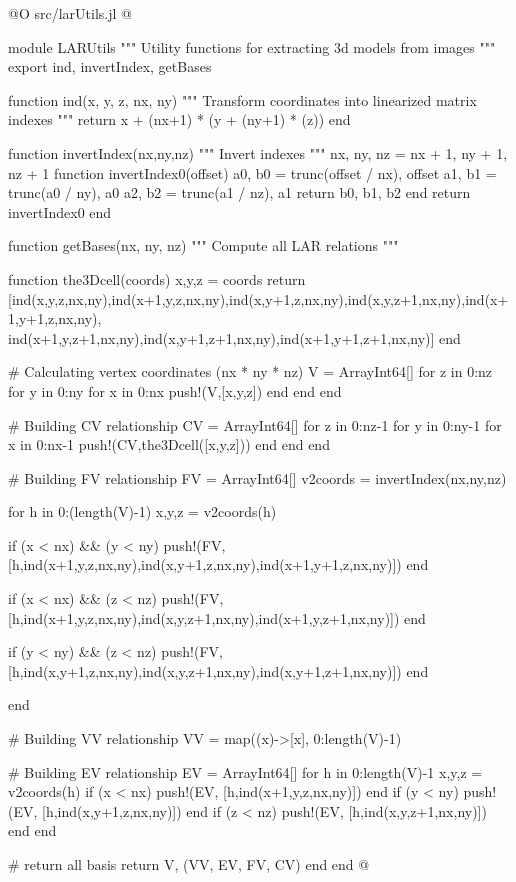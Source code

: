 \documentclass[11pt,oneside]{article}	%
\begin{document}
@O src/larUtils.jl
@{module LARUtils
"""
Utility functions for extracting 3d models from images
"""
export ind, invertIndex, getBases

function ind(x, y, z, nx, ny)
    """
    Transform coordinates into linearized matrix indexes
    """
    return x + (nx+1) * (y + (ny+1) * (z))
  end


function invertIndex(nx,ny,nz)
  """
  Invert indexes
  """
  nx, ny, nz = nx + 1, ny + 1, nz + 1
  function invertIndex0(offset)
      a0, b0 = trunc(offset / nx), offset %
      a1, b1 = trunc(a0 / ny), a0 %
      a2, b2 = trunc(a1 / nz), a1 %
      return b0, b1, b2
  end
  return invertIndex0
end


function getBases(nx, ny, nz)
  """
  Compute all LAR relations
  """

  function the3Dcell(coords)
    x,y,z = coords
    return [ind(x,y,z,nx,ny),ind(x+1,y,z,nx,ny),ind(x,y+1,z,nx,ny),ind(x,y,z+1,nx,ny),ind(x+1,y+1,z,nx,ny),
            ind(x+1,y,z+1,nx,ny),ind(x,y+1,z+1,nx,ny),ind(x+1,y+1,z+1,nx,ny)]
  end

  # Calculating vertex coordinates (nx * ny * nz)
  V = Array{Int64}[]
  for z in 0:nz
    for y in 0:ny
      for x in 0:nx
        push!(V,[x,y,z])
      end
    end
  end


  # Building CV relationship
  CV = Array{Int64}[]
  for z in 0:nz-1
    for y in 0:ny-1
      for x in 0:nx-1
        push!(CV,the3Dcell([x,y,z]))
      end
    end
  end

  # Building FV relationship
  FV = Array{Int64}[]
  v2coords = invertIndex(nx,ny,nz)

  for h in 0:(length(V)-1)
    x,y,z = v2coords(h)

    if (x < nx) && (y < ny)
      push!(FV, [h,ind(x+1,y,z,nx,ny),ind(x,y+1,z,nx,ny),ind(x+1,y+1,z,nx,ny)])
    end

    if (x < nx) && (z < nz)
      push!(FV, [h,ind(x+1,y,z,nx,ny),ind(x,y,z+1,nx,ny),ind(x+1,y,z+1,nx,ny)])
    end

    if (y < ny) && (z < nz)
      push!(FV,[h,ind(x,y+1,z,nx,ny),ind(x,y,z+1,nx,ny),ind(x,y+1,z+1,nx,ny)])
    end

  end

  # Building VV relationship
  VV = map((x)->[x], 0:length(V)-1)

  # Building EV relationship
  EV = Array{Int64}[]
  for h in 0:length(V)-1
    x,y,z = v2coords(h)
    if (x < nx)
      push!(EV, [h,ind(x+1,y,z,nx,ny)])
    end
    if (y < ny)
      push!(EV, [h,ind(x,y+1,z,nx,ny)])
    end
    if (z < nz)
      push!(EV, [h,ind(x,y,z+1,nx,ny)])
    end
  end

  # return all basis
  return V, (VV, EV, FV, CV)
end
end
@}
\end{document}
